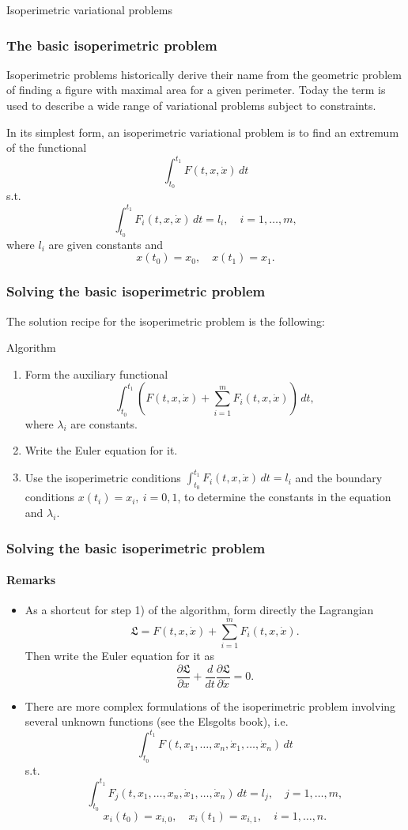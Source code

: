 \documentclass[10pt]{beamer}
\theoremstyle{definition}
\begin{document}
\begin{section}{Isoperimetric variational problems}\label{sec:Isoper}

\begin{frame}[fragile]
\frametitle{The basic isoperimetric problem}
Isoperimetric problems historically derive their name from the geometric problem of finding a figure with maximal area for a given perimeter. Today the term is used to describe a wide range of variational problems subject to constraints.\bigskip

In its simplest form, an isoperimetric variational problem is to find an extremum of the functional \[ \int_{t_0}^{t_1} F(t,x,\dot{x})\,dt \]
s.t. \[ \int_{t_0}^{t_1} F_i(t,x,\dot{x})\,dt = l_i,\quad i=1,\ldots,m, \] 
where $ l_i $ are given constants and \[ x(t_0)=x_0,\quad x(t_1)=x_1. \]
\end{frame}

\begin{frame}[fragile]
\frametitle{Solving the basic isoperimetric problem}
The solution recipe for the isoperimetric problem is the following:
\begin{block}{Algorithm}
\begin{enumerate}
\item Form the auxiliary functional \[ \int_{t_0}^{t_1}\left( F(t,x,\dot{x}) + \sum_{i=1}^{m}F_i(t,x,\dot{x})  \right)\,dt, \] where $ \lambda_i $ are constants.
\item Write the Euler equation for it.
\item Use the isoperimetric conditions $ \int_{t_0}^{t_1} F_i(t,x,\dot{x})\,dt = l_i $ and the boundary conditions $ x(t_i)=x_i,~i=0,1 $, to determine the constants in the equation and $ \lambda_i $.
\end{enumerate}
\end{block}
\end{frame}

\begin{frame}[fragile]
\frametitle{Solving the basic isoperimetric problem}
\framesubtitle{Remarks}
\begin{itemize}
\item As a shortcut for step 1) of the algorithm, form directly the Lagrangian \[ \mathfrak{L} = F(t,x,\dot{x}) + \sum_{i=1}^{m}F_i(t,x,\dot{x}) . \] Then write the Euler equation for it as \[ \dfrac{\partial \mathfrak{L}}{\partial x}+\dfrac{d}{dt}\dfrac{\partial \mathfrak{L}}{\partial \dot{x}}=0. \]
\item There are more complex formulations of the isoperimetric problem involving several unknown functions (see the Elsgolts book), i.e. \[ \int_{t_0}^{t_1} F(t,x_1,\ldots,x_n,\dot{x}_1,\ldots,\dot{x}_n)\,dt \]
s.t. \[ \int_{t_0}^{t_1} F_j(t,x_1,\ldots,x_n,\dot{x}_1,\ldots,\dot{x}_n)\,dt = l_j,\quad j=1,\ldots,m, \] 
\[ x_i(t_0)=x_{i,0},\quad x_i(t_1)=x_{i,1}, \quad i=1,\ldots,n. \]
\end{itemize}
\end{frame}


\end{section}
\end{document}

